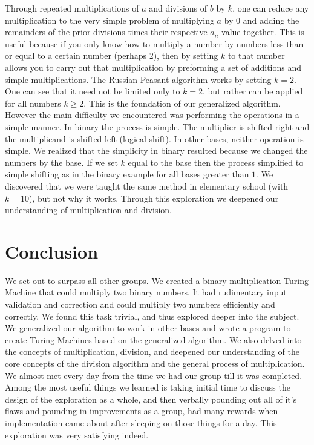 \documentclass{article}
\begin{document}
\noindent Through repeated multiplications of $a$ and divisions of $b$ by $k$, one can reduce any multiplication to the very simple problem of multiplying $a$ by $0$ and adding the remainders of the prior divisions times their respective $a_n$ value together. This is useful because if you only know how to multiply a number by numbers less than or equal to a certain number (perhaps 2), then by setting $k$ to that number allows you to carry out that multiplication by preforming a set of additions and simple multiplications. The Russian Peasant algorithm works by setting $k=2$.
 \\[5pt]
 \noindent One can see that it need not be limited only to $k=2$, but rather can be applied for all numbers $k\geq 2$. This is the foundation of our generalized algorithm. However the main difficulty we encountered was performing the operations in a simple manner. In binary the process is simple. The multiplier is shifted right and the multiplicand is shifted left (logical shift). In other bases, neither operation is simple. We realized that the simplicity in binary resulted because we changed the numbers by the base. If we set $k$ equal to the base then the process simplified to simple shifting as in the binary example for all bases greater than $1$. We discovered that we were taught the same method in elementary school (with $k = 10$), but not why it works. Through this exploration we deepened our understanding of multiplication and division.
	
\section*{Conclusion}
	\noindent We set out to surpass all other groups. We created a binary multiplication Turing Machine that could multiply two binary numbers. It had rudimentary input validation and correction and could multiply two numbers efficiently and correctly. We found this task trivial, and thus explored deeper into the subject. We generalized our algorithm to work in other bases and wrote a program to create Turing Machines based on the generalized algorithm. We also delved into the concepts of multiplication, division, and deepened our understanding of the core concepts of the division algorithm and the general process of multiplication. We almost met every day from the time we had our group till it was completed. Among the most useful things we learned is taking initial time to discuss the design of the exploration as a whole, and then verbally pounding out all of it's flaws and pounding in improvements as a group, had many rewards when implementation came about after sleeping on those things for a day. This exploration was very satisfying indeed.
\end{document}
